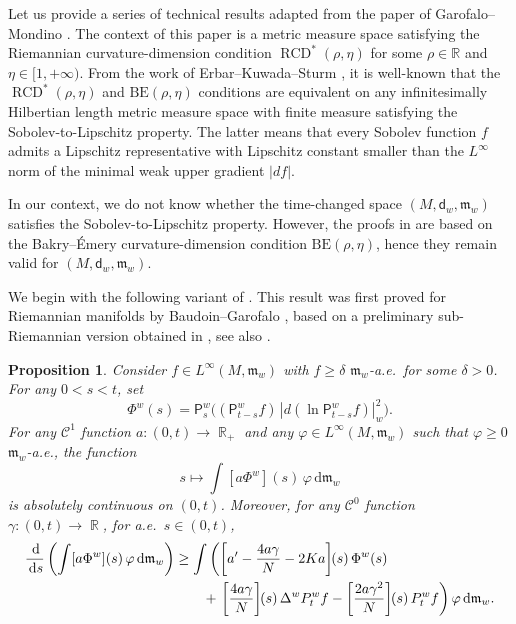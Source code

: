 \documentclass[10pt]{article}
\newcommand{\cC}{\mathcal{C}}
\newcommand{\m}{\mathfrak{m}}
\newcommand{\M}{{\mathit{M}}}
\renewcommand{\d}{\,\mathrm{d}}
\DeclareMathOperator{\RCD}{RCD}
\renewcommand{\P}{\mathsf{P}}
\newcommand{\dist}{\mathsf{d}}
\DeclareMathOperator{\RR}{\mathbb{R}}
\newcommand{\BE}{{\mathrm{BE}}}
\theoremstyle{plain}
\newtheorem{proposition}[theorem]{Proposition}
\theoremstyle{definition}
\newcommand{\Linfw}{L^{\infty}(M,\m_w)}
\begin{document}
Let us provide a series of technical results adapted from the paper of Garofalo--Mondino \cite{GarofaloMondino-13}. The context of this paper is a metric measure space satisfying the Riemannian curvature-dimension condition $\RCD^*(\rho,\eta)$ for some $\rho \in \mathbb{R}$ and $\eta \in [1,+\infty)$. From the work of Erbar--Kuwada--Sturm \cite[Theorem 7]{EKS}, it is well-known that the $\RCD^*(\rho,\eta)$ and $\BE(\rho,\eta)$ conditions are equivalent on any infinitesimally Hilbertian length metric measure space with finite measure satisfying the Sobolev-to-Lipschitz property. The latter means that every Sobolev function $f$ admits a Lipschitz representative with Lipschitz constant smaller than the $L^\infty$ norm of the minimal weak upper gradient $|df|$.

In our context, we do not know whether the time-changed space $(M,\dist_w,\m_w)$ satisfies the Sobolev-to-Lipschitz property. However, the proofs in \cite{GarofaloMondino-13} are based on the Bakry--\'Emery curvature-dimension condition $\BE(\rho,\eta)$, hence they remain valid for $(M,\dist_w,\m_w)$.




We begin with the following variant of \cite[Proposition 3.2]{GarofaloMondino-13}. This result was first proved for Riemannian manifolds by Baudoin--Garofalo \cite[Theorem 2.2]{BaudoinGarofalo}, based on a preliminary sub-Riemannian version obtained in \cite[Proposition 6.5]{BaudoinGarofalo2}, see also \cite[Theorem 5.2]{BaudoinGarofalo3}.



\begin{proposition}\label{prop:gauge}
Consider $f\in L^\infty(\M, \m_w)$ with $f \ge \delta$ $\m_w$-a.e.~for some $\delta>0$. For any $0 < s < t$, set 
\[\Phi^w(s)=\P_s^w\bigg((\P_{t-s}^wf)\, |d(\ln \P^w_{t-s}f)|^2_{w}\bigg).\]
    For any $\cC^1$ function $a\colon(0,t)\to \RR_+$ and any $\varphi\in \Linfw$ such that $\varphi \ge 0$ $\m_w$-a.e., the function
    \[
    s\mapsto \int [ a \Phi^w ](s) \, \varphi\d \m_w 
    \]
    is absolutely continuous on $(0,t)$. Moreover, for any $\cC^0$ function $\gamma\colon(0,t)\to \RR$, for a.e.~$s\in(0,t)$,
    \begin{align*}
     \frac{\d}{\d s} \left( \int [ a \Phi^w ](s)\, \varphi\d \m_w  \right) \nonumber 
    & \geq \int \left(\left[a'-\frac{4a \gamma}{N}-2Ka\right] \mkern-5mu(s) \, \Phi^w(s)\right.  \nonumber \\
    &  \qquad +  \left. \left[\frac{4a\gamma}{N}\right]\mkern-5mu(s)\, \Delta^w P_{t}^wf-\left[\frac{2a\gamma^2}{N} \right]\mkern-5mu(s)\, P_{t}^wf\right)\varphi\d \m_w . 
    \end{align*}

\end{proposition}
\end{document}
